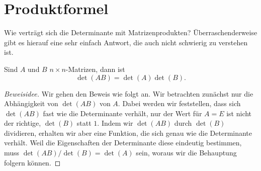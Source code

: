 %
%
%
\section{Produktformel}
Wie verträgt sich die Determinante mit Matrizenprodukten?
Überraschenderweise gibt es hierauf eine sehr einfach Antwort,
die auch nicht schwierig zu verstehen ist.

\begin{satz}\label{detprodukt}
Sind $A$ und $B$ $n\times n$-Matrizen, dann ist
\[
\det(AB)=\det(A)\det(B).
\]
\end{satz}

\begin{proof}[Beweisidee]
Wir gehen den Beweis wie folgt an.
Wir betrachten zunächst nur die Abhängigkeit von $\det(AB)$ von $A$.
Dabei werden wir feststellen,
dass sich $\det(AB)$ fast wie die Determinante verhält, nur der
Wert für $A=E$ ist nicht der richtige, $\det(B)$ statt $1$.
Indem wir
$\det(AB)$ durch $\det(B)$ dividieren, erhalten wir aber eine Funktion,
die sich genau wie die Determinante verhält.
Weil die Eigenschaften der Determinante diese eindeutig bestimmen, muss
$\det(AB)/\det(B)=\det(A)$ sein, woraus wir die Behauptung folgern können.
\end{proof}


